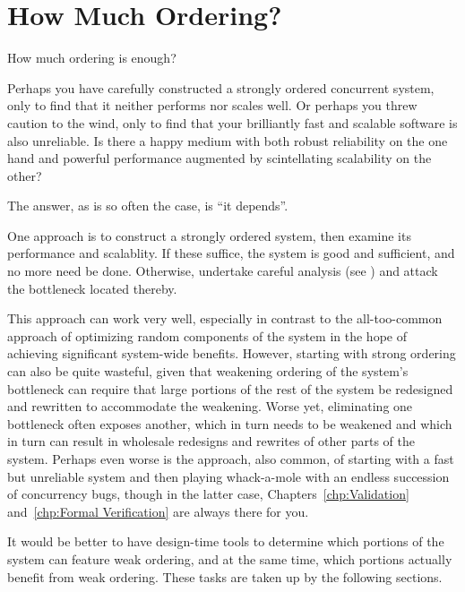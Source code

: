 
\section{How Much Ordering?}
\label{sec:app:questions:How Much Ordering?}

How much ordering is enough?

Perhaps you have carefully constructed a strongly ordered concurrent
system, only to find that it neither performs nor scales well.
Or perhaps you threw caution to the wind, only to find that your
brilliantly fast and scalable software is also unreliable.
Is there a happy medium with both robust reliability on the one
hand and powerful performance augmented by scintellating scalability on
the other?

The answer, as is so often the case, is ``it depends''.

One approach is to construct a strongly ordered system, then examine
its performance and scalablity.
If these suffice, the system is good and sufficient, and no more need
be done.
Otherwise, undertake careful analysis
(see )
and attack the bottleneck located thereby.

This approach can work very well, especially in contrast to the
all-too-common approach of optimizing random components of the system
in the hope of achieving significant system-wide benefits.
However, starting with strong ordering can also be quite wasteful,
given that weakening ordering of the system's bottleneck can require
that large portions of the rest of the system be redesigned and
rewritten to accommodate the weakening.
Worse yet, eliminating one bottleneck often exposes another, which
in turn needs to be weakened and which in turn can result in wholesale
redesigns and rewrites of other parts of the system.
Perhaps even worse is the approach, also common, of starting with a
fast but unreliable system and then playing whack-a-mole with an endless
succession of concurrency bugs, though in the latter case,
Chapters~\ref{chp:Validation}
and~\ref{chp:Formal Verification}
are always there for you.

It would be better to have design-time tools to determine which portions
of the system can feature weak ordering, and at the same time, which
portions actually benefit from weak ordering.
These tasks are taken up by the following sections.

